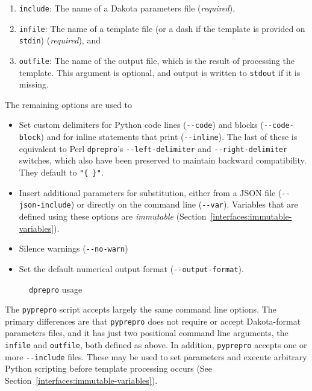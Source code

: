 {\begin{enumerate}
 \item \texttt{include}: The name of a Dakota parameters file (\emph{required}),
 \item \texttt{infile}: The name of a template file (or a dash if the template 
	 is provided on \texttt{stdin}) (\emph{required}), and 
 \item \texttt{outfile}: The name of the output file, which is the result of
         processing the template. This argument is optional, and output is 
	 written to \texttt{stdout} if it is missing.
\end{enumerate}

The remaining options are used to
\begin{itemize}
  \item Set custom delimiters for Python code lines (\texttt{-\/-code}) and blocks 
    (\texttt{-\/-code-block}) and for inline statements that print 
    (\texttt{-\/-inline}). The last of these is equivalent to Perl \texttt{dprepro}'s 
    \texttt{-\/-left-delimiter} and \texttt{-\/-right-delimiter} switches, which also
    have been preserved to maintain backward compatibility. They default to 
    \texttt{"\{ \}"}.
  \item Insert additional parameters for substitution, either from a JSON file
   (\texttt{-\/-json-include}) or directly on the command line (\texttt{-\/-var}).
   Variables that are defined using these options are \emph{immutable}
   (Section~\ref{interfaces:immutable-variables}).
  \item Silence warnings (\texttt{-\/-no-warn})
  \item Set the default numerical output format (\texttt{-\/-output-format}).
\end{itemize}

\begin{figure}
  \centering
  \begin{bigbox}
    \begin{tiny}
    \end{tiny}
  \end{bigbox}
  \caption{\texttt{dprepro} usage}
  \label{advint:dprepro_usage}
\end{figure}

The \texttt{pyprepro} script accepts largely the same command line options.
The primary differences are that \texttt{pyprepro} does not require or accept
Dakota-format parameters files, and it has just two positional command line
arguments, the \texttt{infile} and \texttt{outfile}, both defined as above.
In addition, \texttt{pyprepro} accepts one or more \texttt{-\/-include} files.
These may be used to set parameters and execute arbitrary Python scripting 
before template processing occurs (See 
Section~\ref{interfaces:immutable-variables}).

}
